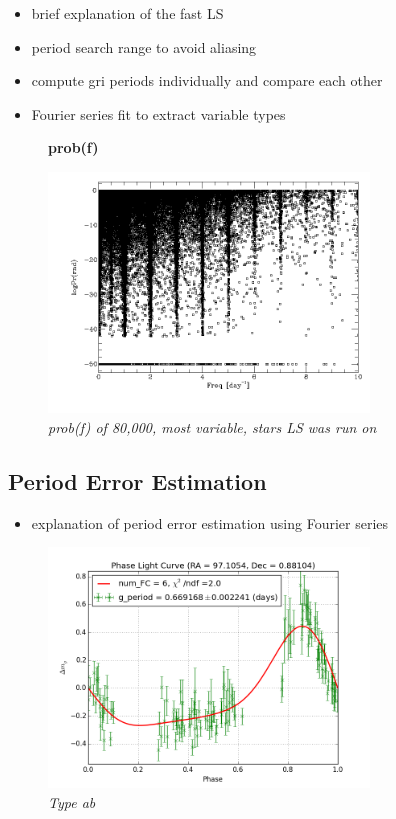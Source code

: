 \documentclass[aps,prl,twocolumn,superscriptaddress]{revtex4-1}
\begin{document}
\begin{itemize}
	\item{} brief explanation of the fast LS
	\item{} period search range to avoid aliasing
	\item{} compute gri periods individually and compare each other 
	\item{} Fourier series fit to extract variable types
\end{itemize}



\begin{figure}[H]
 \centering
 \textbf{prob(f)}\par\medskip
 	\includegraphics[width=3.35in]{figures/fromJT/probf.png}
 \caption{\it \small{prob(f) of 80,000, most variable, stars LS was run on}}
 \label{fig:quartiles}
\end{figure}

\subsection{Period Error Estimation}

\begin{itemize}
	\item{} explanation of period error estimation using Fourier series
\end{itemize}

\begin{figure}[H]
 \centering
 	\includegraphics[width=3.35in]{figures/FSP1_g_LC_rrrtest_p5_grp19.png}
 \caption{\it \small{Type ab}}
 \label{fig:quartiles}
\end{figure}
\end{document}
